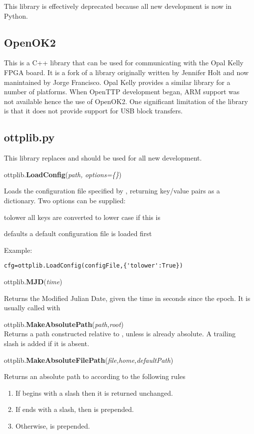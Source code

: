 This library is effectively deprecated because all new development is now in Python.

\subsection{OpenOK2}

This is a C++ library that can be used for communicating with the Opal Kelly FPGA board. It is 
a fork of a library originally written by Jennifer Holt and now manintained by Jorge Francisco.
Opal Kelly provides a similar library for a number of platforms. When OpenTTP development began,
ARM support was not available hence the use of OpenOK2. One significant limitation 
of the library is that it does not provide support for USB block transfers.

\subsection{ottplib.py}

This library replaces  and should be used for all new development.

ottplib.{\bfseries{LoadConfig}}(\textit{path, options=\{\}})

Loads the configuration file specified by , returning key/value pairs as
a dictionary. Two options can be supplied:
\begin{description*}
\item[tolower] all keys are converted to lower case if this is 
\item[defaults] a default configuration file is loaded first
\end{description*}
Example:
\begin{lstlisting}
cfg=ottplib.LoadConfig(configFile,{'tolower':True})
\end{lstlisting}

ottplib.{\bfseries{MJD}}(\textit{time})

Returns the Modified Julian Date, given the time in seconds since the epoch. It is usually called 
with 

ottplib.{\bfseries{MakeAbsolutePath}}(\textit{path,root})\\
Returns a path constructed relative to , unless  is already absolute.
A trailing slash is added if it is absent.

ottplib.{\bfseries{MakeAbsoluteFilePath}}(\textit{file,home,defaultPath})

Returns an absolute path to  according to the following  rules
\begin{enumerate}
	\item If  begins with a slash then it is returned unchanged.
	\item If  ends with a slash, then  is prepended.
	\item Otherwise,  is prepended.
\end{enumerate}


